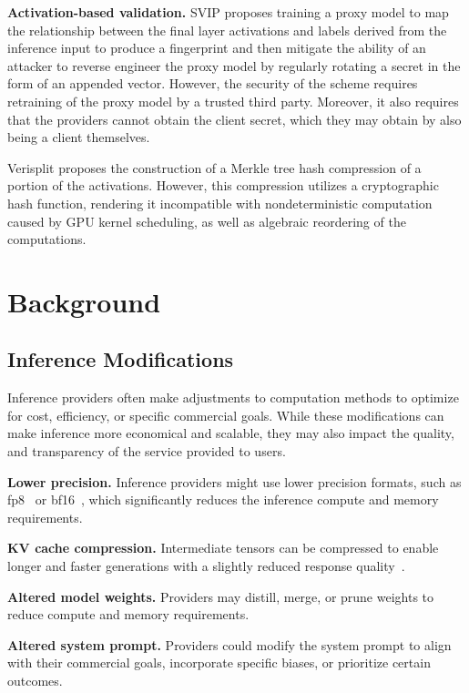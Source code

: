 \documentclass{article}
\theoremstyle{plain}
\theoremstyle{definition}
\theoremstyle{remark}
\begin{document}
\textbf{Activation-based validation.}
SVIP \citep{svip} proposes training a proxy model to map the relationship between the final layer activations and labels derived from the inference input to produce a fingerprint and then mitigate the ability of an attacker to reverse engineer the proxy model by regularly rotating a secret in the form of an appended vector.
However, the security of the scheme requires retraining of the proxy model by a trusted third party.
Moreover, it also requires that the providers cannot obtain the client secret, which they may obtain by also being a client themselves.

Verisplit \citep{Verisplit} proposes the construction of a Merkle tree hash compression of a portion of the activations.
However, this compression utilizes a cryptographic hash function, rendering it incompatible with nondeterministic computation caused by GPU kernel scheduling, as well as algebraic reordering of the computations. 

\section{Background}

\subsection{Inference Modifications}

Inference providers often make adjustments to computation methods to optimize for cost, efficiency, or specific commercial goals.
While these modifications can make inference more economical and scalable, they may also impact the quality, and transparency of the service provided to users.

\textbf{Lower precision.}
Inference providers might use lower precision formats, such as fp8~\citep{micikevicius2022fp8formatsdeeplearning} or bf16~\citep{kalamkar2019studybfloat16deeplearning}, which significantly reduces the inference compute and memory requirements.

\textbf{KV cache compression.}
Intermediate tensors can be compressed to enable longer and faster generations with a slightly reduced response quality~\citep{shi2024costdownreviewmethods}.

\textbf{Altered model weights.} Providers may distill, merge, or prune weights to reduce compute and memory requirements.

\textbf{Altered system prompt.} Providers could modify the system prompt to align with their commercial goals, incorporate specific biases, or prioritize certain outcomes.
\end{document}
